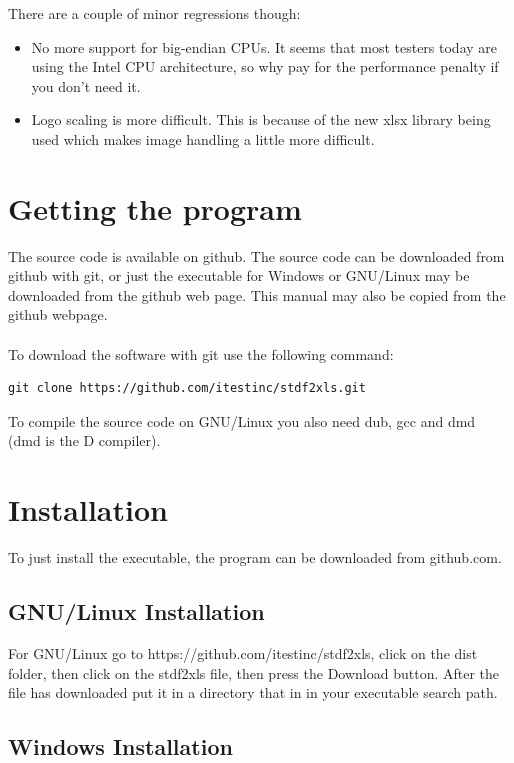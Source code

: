 \documentclass[letterpaper]{article}
\begin{document}
There are a couple of minor regressions though:
\begin{itemize}
\item No more support for big-endian CPUs.
It seems that most testers today are using the Intel CPU architecture,
so why pay for the performance penalty if you don't need it.
\item Logo scaling is more difficult.  This is because of
the new xlsx library being used which makes image handling
a little more difficult.
\end{itemize}

\section{\bf Getting the program}

The source code is available on github. The source code can be downloaded
from github with git, or just the executable for Windows or GNU/Linux
may be downloaded from the github web page.  This manual may also be copied
from the github webpage.\\
\\
To download the software with git use the following command:
\begin{verbatim}
git clone https://github.com/itestinc/stdf2xls.git
\end{verbatim}

\noindent To compile the source code on GNU/Linux you also need dub, gcc and dmd (dmd is the D compiler).

\section{\bf Installation}

To just install the executable, the program can be downloaded from github.com.

\subsection{\bf GNU/Linux Installation}

For GNU/Linux go to https://github.com/itestinc/stdf2xls, click on the dist folder, then
click on the stdf2xls file, then press the Download button.  After the file has downloaded
put it in a directory that in in your executable search path.

\subsection{\bf Windows Installation}
\end{document}
